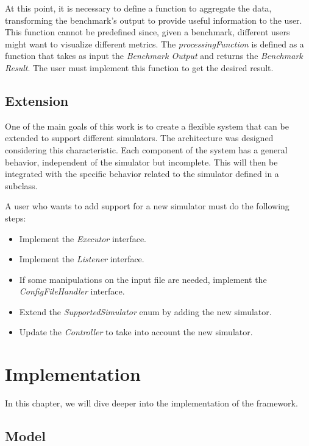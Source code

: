 \documentclass[12pt,a4paper,openright,twoside]{book}
\begin{document}
At this point, it is necessary to define a function to aggregate the data, transforming the benchmark's output to provide useful information to the user.
This function cannot be predefined since, given a benchmark, different users might want to visualize different metrics.
The \emph{processingFunction} is defined as a function that takes as input the \emph{Benchmark Output} and returns the \emph{Benchmark Result}.
The user must implement this function to get the desired result.

\section{Extension}

One of the main goals of this work is to create a flexible system that can be extended to support different simulators.
The architecture was designed considering this characteristic.
Each component of the system has a general behavior, independent of the simulator but incomplete.
This will then be integrated with the specific behavior related to the simulator defined in a subclass.

A user who wants to add support for a new simulator must do the following steps:
\begin{itemize}
  \item Implement the \emph{Executor} interface.
  \item Implement the \emph{Listener} interface.
  \item If some manipulations on the input file are needed, implement the \emph{ConfigFileHandler} interface.
  \item Extend the \emph{SupportedSimulator} enum by adding the new simulator.
  \item Update the \emph{Controller} to take into account the new simulator.
\end{itemize}

\chapter{Implementation}

In this chapter, we will dive deeper into the implementation of the framework.

\section{Model}
\end{document}
